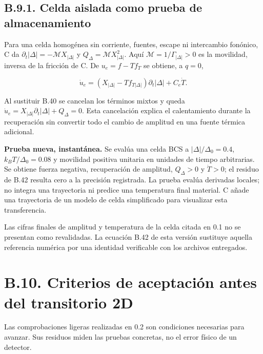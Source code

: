 \documentclass[
  spanish,
  10pt,
  a4paper,
]{article}
\begin{document}
\subsection{B.9.1. Celda aislada como prueba de
almacenamiento}\label{b.9.1.-celda-aislada-como-prueba-de-almacenamiento}

Para una celda homogénea sin corriente, fuentes, escape ni intercambio
fonónico, C da \(\partial_t|\Delta|=-\mathcal M X_{|\Delta|}\) y
\(Q_\Delta=\mathcal M X_{|\Delta|}^2\). Aquí
\(\mathcal M=1/\Gamma_{|\Delta|}>0\) es la movilidad, inversa de la
fricción de C. De \(u_e=f-Tf_T\) se obtiene, a \(q=0\),

\[
\dot u_e=(X_{|\Delta|}-T f_{T|\Delta|})\partial_t|\Delta|
+C_e\dot T.
\tag{B.42}
\]

Al sustituir B.40 se cancelan los términos mixtos y queda
\(\dot u_e=X_{|\Delta|}\partial_t|\Delta|+Q_\Delta=0\). Esta cancelación
explica el calentamiento durante la recuperación sin convertir todo el
cambio de amplitud en una fuente térmica adicional.

\textbf{Prueba nueva, instantánea.} Se evalúa una celda BCS a
\(|\Delta|/\Delta_0=0.4\), \(k_BT/\Delta_0=0.08\) y movilidad positiva
unitaria en unidades de tiempo arbitrarias. Se obtiene fuerza negativa,
recuperación de amplitud, \(Q_\Delta>0\) y \(\dot T>0\); el residuo de
B.42 resulta cero a la precisión registrada. La prueba evalúa derivadas
locales; no integra una trayectoria ni predice una temperatura final
material. C añade una trayectoria de un modelo de celda simplificado
para visualizar esta transferencia.

Las cifras finales de amplitud y temperatura de la celda citada en 0.1
no se presentan como revalidadas. La ecuación B.42 de esta versión
sustituye aquella referencia numérica por una identidad verificable con
los archivos entregados.

\section{B.10. Criterios de aceptación antes del transitorio
2D}\label{b.10.-criterios-de-aceptaciuxf3n-antes-del-transitorio-2d}

Las comprobaciones ligeras realizadas en 0.2 son condiciones necesarias
para avanzar. Sus residuos miden las pruebas concretas, no el error
físico de un detector.
\end{document}

